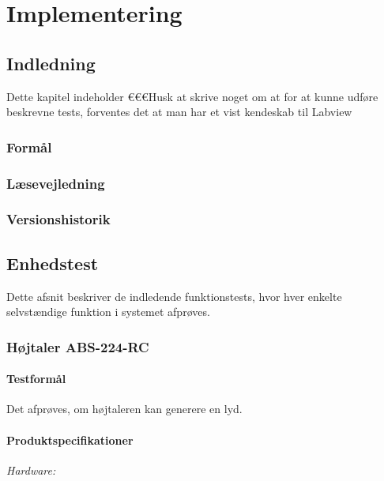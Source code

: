 \chapter{Implementering}

\section{Indledning}
	Dette kapitel indeholder €€€Husk at skrive noget om at for at kunne udføre beskrevne tests, forventes det at man har et vist kendeskab til Labview
	  
		\subsection{Formål}
	
		\subsection{Læsevejledning}	
	
		
		\subsection{Versionshistorik}

 
\section{Enhedstest}
	Dette afsnit beskriver de indledende funktionstests, hvor hver enkelte selvstændige funktion i systemet afprøves. 
	
	\subsection{Højtaler ABS-224-RC}
	\label{etha}
		\subsubsection{Testformål}
		Det afprøves, om højtaleren kan generere en lyd.
		\subsubsection{Produktspecifikationer}
	
	
		\textit{Hardware:}\\
		\\
		\\
		\pins\\
		\arduino\\
		\PC\\
		\usbkabel\\
	
